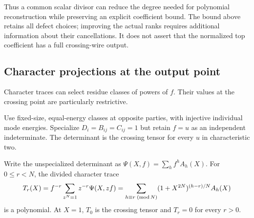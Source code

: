 Thus a common scalar divisor can reduce the degree needed for polynomial reconstruction while preserving an explicit coefficient bound. The bound above retains all defect choices; improving the actual ranks requires additional information about their cancellations. It does not assert that the normalized top coefficient has a full crossing-wire output.


\subsection{Character projections at the output point}
Character traces can select residue classes of powers of $f$. Their values at the crossing point are particularly restrictive.

\begin{proposition}\label{prop:character-output}
Use fixed-size, equal-energy classes at opposite parties, with injective individual mode energies. Specialize $D_i=B_{ij}=C_{ij}=1$ but retain $f=u$ as an independent indeterminate. The determinant is the crossing tensor for every $u$ in characteristic two.

Write the unspecialized determinant as $\Psi(X,f)=\sum_h f^h A_h(X)$. For $0\leq r<N$, the divided character trace
\[
 T_r(X)=f^{-r}\sum_{z^N=1}z^{-r}\Psi(X,zf)
 =\sum_{h\equiv r\;({\rm mod}\,N)}
 (1+X^{2N})^{(h-r)/N}A_h(X)
\]
is a polynomial. At $X=1$, $T_0$ is the crossing tensor and $T_r=0$ for every $r>0$.
\end{proposition}
